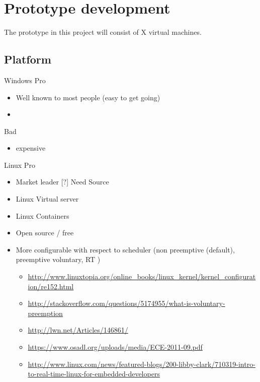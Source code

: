 \chapter{Prototype development}
The prototype in this project will consist of X virtual machines.



\section{Platform}

Windows
Pro
\begin{itemize}
	\item Well known to most people (easy to get going) 
	\item 
\end{itemize}

Bad
\begin{itemize}
	\item expensive
\end{itemize}



Linux
Pro
\begin{itemize}
	\item Market leader [?] Need Source
	\item Linux Virtual server
	\item Linux Containers
	\item Open source / free
	\item More configurable with respect to scheduler (non preemptive (default), preemptive voluntary, RT ) 
	\begin{itemize}
		\item \url{http://www.linuxtopia.org/online_books/linux_kernel/kernel_configuration/re152.html}
		\item \url{http://stackoverflow.com/questions/5174955/what-is-voluntary-preemption}
		\item \url{http://lwn.net/Articles/146861/}
		\item \url{https://www.osadl.org/uploads/media/ECE-2011-09.pdf}
		\item \url{http://www.linux.com/news/featured-blogs/200-libby-clark/710319-intro-to-real-time-linux-for-embedded-developers}
								
	\end{itemize}
\end{itemize}




